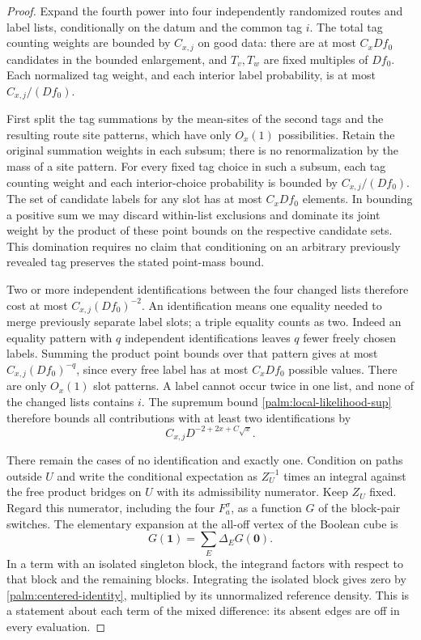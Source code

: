 \begin{proof}
Expand the fourth power into four independently randomized routes
and label lists, conditionally on the datum and the common tag $i$.
The total tag counting weights are bounded by $C_{x,j}$ on good data:
there are at most $C_xDf_0$ candidates in the bounded enlargement,
and $T_v,T_w$ are fixed multiples of $Df_0$.  Each normalized tag
weight, and each interior label probability, is at most
$C_{x,j}/(Df_0)$.

First split the tag summations by the mean-sites of the second tags
and the resulting route site patterns, which have only $O_x(1)$
possibilities.  Retain the original summation weights in each subsum;
there is no renormalization by the mass of a site pattern.  For every
fixed tag choice in such a subsum, each tag counting weight and each
interior-choice probability is bounded by $C_{x,j}/(Df_0)$.  The set of
candidate labels for any slot has at most $C_xDf_0$ elements.  In bounding
a positive sum we may discard within-list exclusions and dominate its
joint weight by the product of these point bounds on the respective
candidate sets.  This domination requires no claim that conditioning on
an arbitrary previously revealed tag preserves the stated point-mass bound.

Two or more independent identifications between the four changed
lists therefore cost at most $C_{x,j}(Df_0)^{-2}$.  An identification means
one equality needed to merge previously separate label slots; a triple
equality counts as two.  Indeed an equality pattern with $q$ independent
identifications leaves $q$ fewer freely chosen labels.  Summing the
product point bounds over that pattern gives at most
$C_{x,j}(Df_0)^{-q}$, since every free label has at most $C_xDf_0$ possible
values.  There are only $O_x(1)$ slot patterns.  A label cannot occur
twice in one list, and none of the changed lists contains $i$.
The supremum bound
\eqref{palm:local-likelihood-sup} therefore bounds all contributions
with at least two identifications by
\begin{equation}\label{palm:many-matches}
                  C_{x,j}D^{-2+2x+C\sqrt x}.
\end{equation}

There remain the cases of no identification and exactly one.
Condition on paths outside $U$ and write the conditional expectation
as $Z_U^{-1}$ times an integral against the free product bridges on
$U$ with its admissibility numerator.  Keep $Z_U$ fixed.  Regard
this numerator, including the four $F_a^\sigma$, as a function $G$ of
the block-pair switches.  The elementary expansion at the all-off
vertex of the Boolean cube is
\begin{equation}\label{palm:switch-expansion}
          G(\boldsymbol1)=\sum_{E}\Delta_EG(\boldsymbol0).
\end{equation}
In a term with an isolated singleton block, the integrand factors
with respect to that block and the remaining blocks.  Integrating
the isolated block gives zero by
\eqref{palm:centered-identity}, multiplied by its unnormalized
reference density.  This is a statement about each term of the
mixed difference: its absent edges are off in every evaluation.


\end{proof}
